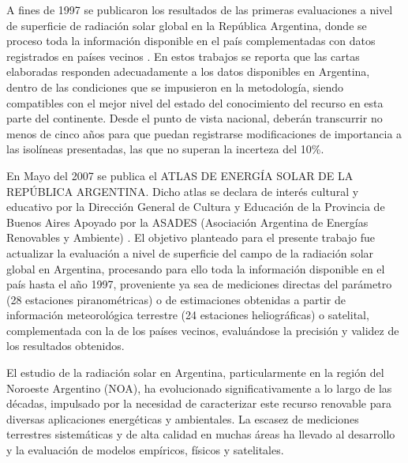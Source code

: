 \documentclass[letterpaper,12pt, twoside]{report}
\providecommand{\DIFdeltex}[1]{{\protect\color{red} \scriptsize #1}} %
\providecommand{\DIFdel}[1]{\texorpdfstring{\DIFdeltex{#1}}{}} %
\begin{document}
\DIFdel{A fines de 1997 se publicaron los resultados de las primeras evaluaciones a nivel de superficie de radiación solar global en la República Argentina, donde se proceso toda la información disponible en el país complementadas con datos registrados en países vecinos \cite{GrossiGallegos1998A, GrossiGallegos1998B}. En estos trabajos se reporta que  las cartas elaboradas responden adecuadamente a los datos  disponibles en Argentina, dentro de las condiciones que se impusieron en la metodología, siendo compatibles con el mejor nivel del estado del conocimiento del recurso en esta parte del continente.
Desde el punto de vista nacional, deberán transcurrir no menos de cinco años para que puedan registrarse modificaciones de importancia a las isolíneas presentadas, las que no superan la incerteza del 10\%.}%

\DIFdel{En Mayo del 2007 se publica el ATLAS DE ENERGÍA SOLAR DE LA REPÚBLICA ARGENTINA. Dicho atlas se declara de interés cultural y educativo por la Dirección General
de Cultura y Educación de la Provincia de Buenos Aires Apoyado por la ASADES (Asociación Argentina de Energías Renovables y Ambiente) \citep{GrossiRighini2007}. El objetivo planteado para el presente trabajo fue actualizar la evaluación a nivel de superficie del campo de la radiación solar global en Argentina, procesando para ello toda la información disponible en el país hasta el año 1997, proveniente ya sea de mediciones directas del parámetro (28 estaciones piranométricas) o de estimaciones obtenidas a partir de información meteorológica terrestre (24 estaciones heliográficas) o satelital, complementada con la de los países vecinos, evaluándose la precisión y validez de los resultados obtenidos.}%

\DIFdel{El estudio de la radiación solar en Argentina, particularmente en la región del Noroeste Argentino (NOA), ha evolucionado significativamente a lo largo de las décadas, impulsado por la necesidad de caracterizar este recurso renovable para diversas aplicaciones energéticas y ambientales. La escasez de mediciones terrestres sistemáticas y de alta calidad en muchas áreas ha llevado al desarrollo y la evaluación de modelos empíricos, físicos y satelitales.}%
\end{document}
